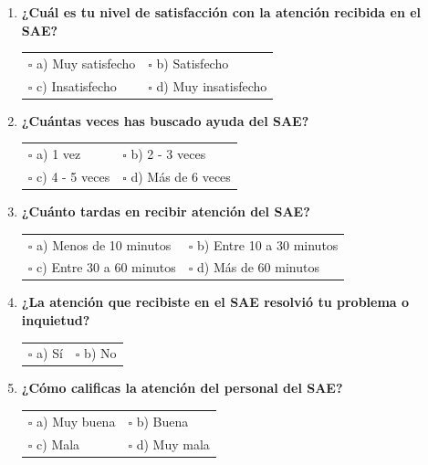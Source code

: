 \documentclass{article}
\begin{document}
\begin{enumerate}
  \item \textbf{¿Cuál es tu nivel de satisfacción con la atención recibida en el SAE?} \\
  \hspace*{5mm} \begin{tabular}{@{}ll@{}}
      $\square$ a) Muy satisfecho & $\square$ b) Satisfecho \\
      $\square$ c) Insatisfecho & $\square$ d) Muy insatisfecho
  \end{tabular}
  
  \item \textbf{¿Cuántas veces has buscado ayuda del SAE?} \\
  \hspace*{5mm} \begin{tabular}{@{}ll@{}}
      $\square$ a) 1 vez & $\square$ b) 2 - 3 veces \\
      $\square$ c) 4 - 5 veces & $\square$ d) Más de 6 veces
  \end{tabular}
  
  \item \textbf{¿Cuánto tardas en recibir atención del SAE?} \\
  \hspace*{5mm} \begin{tabular}{@{}ll@{}}
      $\square$ a) Menos de 10 minutos & $\square$ b) Entre 10 a 30 minutos \\
      $\square$ c) Entre 30 a 60 minutos & $\square$ d) Más de 60 minutos
  \end{tabular}
  
  \item \textbf{¿La atención que recibiste en el SAE resolvió tu problema o inquietud?} \\
  \hspace*{5mm} \begin{tabular}{@{}ll@{}}
      $\square$ a) Sí & $\square$ b) No
  \end{tabular}
  
  \item \textbf{¿Cómo calificas la atención del personal del SAE?} \\
  \hspace*{5mm} \begin{tabular}{@{}ll@{}}
      $\square$ a) Muy buena & $\square$ b) Buena \\
      $\square$ c) Mala & $\square$ d) Muy mala
  \end{tabular}
\end{enumerate}
\end{document}
